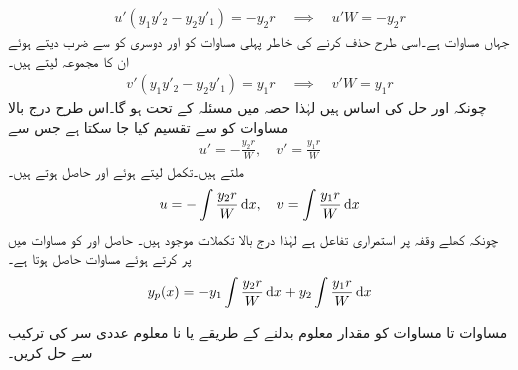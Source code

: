 \begin{align*}
u'(y_1y'_2-y_2y'_1)=-y_2r\quad \implies \quad u'W=-y_2r
\end{align*}
جہاں  مساوات   ہے۔اسی طرح  حذف کرنے کی خاطر  پہلی مساوات کو  اور دوسری کو  سے ضرب دیتے ہوئے ان کا مجموعہ لیتے ہیں۔
\begin{align*}
v'(y_1y'_2-y_2y'_1)=y_1r\quad \implies \quad v'W=y_1r
\end{align*}
چونکہ  اور  حل کی اساس ہیں لہٰذا حصہ  میں مسئلہ  کے تحت  ہو گا۔اس طرح درج بالا مساوات کو  سے تقسیم کیا جا سکتا ہے جس سے
\begin{align*}
u'=-\frac{y_2r}{W}, \quad v'=\frac{y_1r}{W}
\end{align*}
ملتے ہیں۔تکمل لیتے ہوئے  اور  حاصل ہوتے ہیں۔
\begin{align*}
u=-\int \frac{y_2r}{W} \dif x, \quad v=\int \frac{y_1r}{W} \dif x
\end{align*}
چونکہ کھلے وقفہ  پر  استمراری تفاعل ہے لہٰذا درج بالا تکملات موجود ہیں۔ حاصل  اور  کو مساوات  میں پر کرتے ہوئے مساوات  حاصل ہوتا ہے۔
\begin{align*}
y_p(x)=-y_1\int \frac{y_2r}{W} \dif x+y_2\int \frac{y_1r}{W} \dif x
\end{align*}

مساوات  تا مساوات  کو مقدار معلوم بدلنے کے طریقے یا نا معلوم عددی سر کی ترکیب سے حل کریں۔


